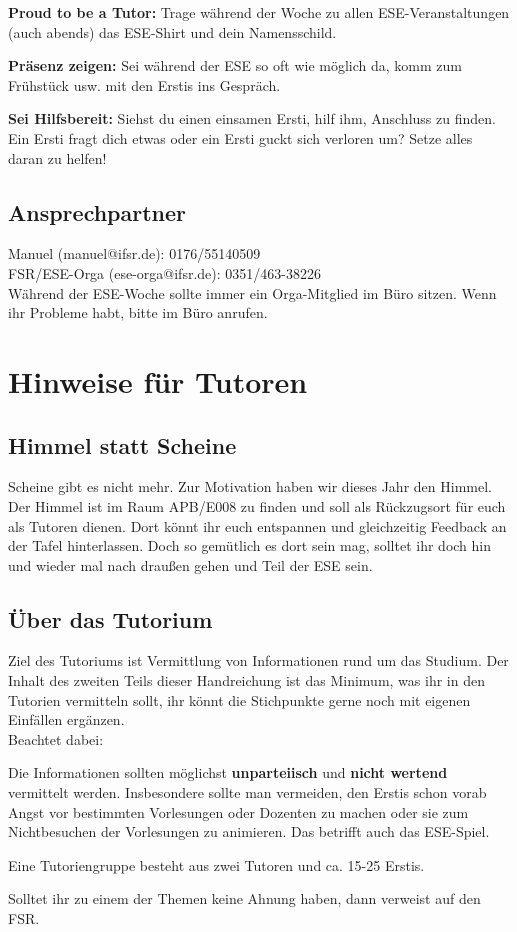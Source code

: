 \documentclass[a4paper,12pt]{report}
\begin{document}
\begin{itemize*}
    \item \textbf{Proud to be a Tutor:} Trage während der Woche zu allen ESE-Veranstaltungen (auch abends) das ESE-Shirt und dein Namensschild.
    \item \textbf{Präsenz zeigen:} Sei während der ESE so oft wie möglich da, komm zum Frühstück usw. mit den Erstis ins Gespräch.
    \item \textbf{Sei Hilfsbereit:} Siehst du einen einsamen Ersti, hilf ihm, Anschluss zu finden. Ein Ersti fragt dich etwas oder ein Ersti guckt sich verloren um? Setze alles daran zu helfen!
\end{itemize*}

\section*{Ansprechpartner}
Manuel (manuel@ifsr.de): 0176/55140509 \\
FSR/ESE-Orga (ese-orga@ifsr.de): 0351/463-38226 \\

Während der ESE-Woche sollte immer ein Orga-Mitglied im Büro sitzen. Wenn ihr Probleme habt, bitte im Büro anrufen.

\tableofcontents
\chapter{Hinweise für Tutoren}
\section{Himmel statt Scheine}
Scheine gibt es nicht mehr. Zur Motivation haben wir dieses Jahr den Himmel. Der Himmel ist im Raum APB/E008 zu finden und soll als Rückzugsort für euch als Tutoren dienen. Dort könnt ihr euch entspannen und gleichzeitig Feedback an der Tafel hinterlassen. Doch so gemütlich es dort sein mag, solltet ihr doch hin und wieder mal nach draußen gehen und Teil der ESE sein.

\section{Über das Tutorium}
Ziel des Tutoriums ist Vermittlung von Informationen rund um das Studium. Der Inhalt des zweiten Teils dieser Handreichung ist das Minimum, was ihr in den Tutorien vermitteln sollt, ihr könnt die Stichpunkte gerne noch mit eigenen Einfällen ergänzen.\\
Beachtet dabei:
\begin{itemize*}
\item Die Informationen sollten möglichst \textbf{unparteiisch} und \textbf{nicht wertend} vermittelt werden.
Insbesondere sollte man vermeiden, den Erstis schon vorab Angst vor bestimmten Vorlesungen oder Dozenten zu machen oder sie zum Nichtbesuchen der Vorlesungen zu animieren. Das betrifft auch das ESE-Spiel.
\item Eine Tutoriengruppe besteht aus zwei Tutoren und ca. 15-25 Erstis.
\item Solltet ihr zu einem der Themen keine Ahnung haben, dann verweist auf den FSR.
\end{itemize*}
\end{document}

